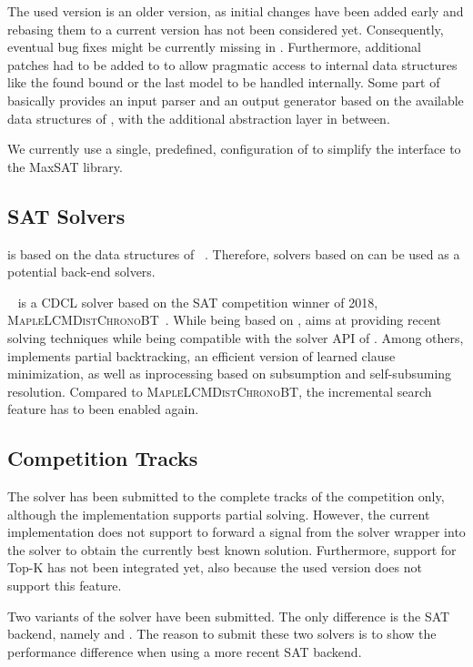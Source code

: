 \documentclass[conference]{IEEEtran}
\begin{document}
The used \openwbo version is an older version, as initial changes have been added early and rebasing them to a current version has not been considered yet.
Consequently, eventual bug fixes might be currently missing in \smax.
Furthermore, additional patches had to be added to \openwbo to allow pragmatic access to internal data structures like the found bound or the last model to be handled internally.
Some part of \smax basically provides an input parser and an output generator based on the available data structures of \openwbo, with the additional abstraction layer in between.

We currently use a single, predefined, configuration of \openwbo to simplify the interface to the MaxSAT library.

\subsection{SAT Solvers}

\openwbo is based on the data structures of \minisat~\cite{minisat-sat03,MiniSat:github}.
Therefore, solvers based on \minisat can be used as a potential back-end solvers.

\mergesat~\cite{mergesat} is a CDCL solver based on the SAT competition winner of 2018, \textsc{MapleLCMDistChronoBT}~\cite{chronobt}.
While being based on \minisat, \mergesat aims at providing recent solving techniques while being compatible with the solver API of \minisat.
Among others, \mergesat implements partial backtracking, an efficient version of learned clause minimization, as well as inprocessing based on subsumption and self-subsuming resolution.
Compared to \textsc{MapleLCMDistChronoBT}, the incremental search feature has to been enabled again.

\subsection{Competition Tracks}

The solver has been submitted to the complete tracks of the competition only, although the implementation supports partial solving.
However, the current implementation does not support to forward a signal from the solver wrapper into the solver to obtain the currently best known solution.
Furthermore, support for Top-K has not been integrated yet, also because the used \openwbo version does not support this feature.

Two variants of the solver have been submitted.
The only difference is the SAT backend, namely \minisat and \mergesat.
The reason to submit these two solvers is to show the performance difference when using a more recent SAT backend.
\end{document}
